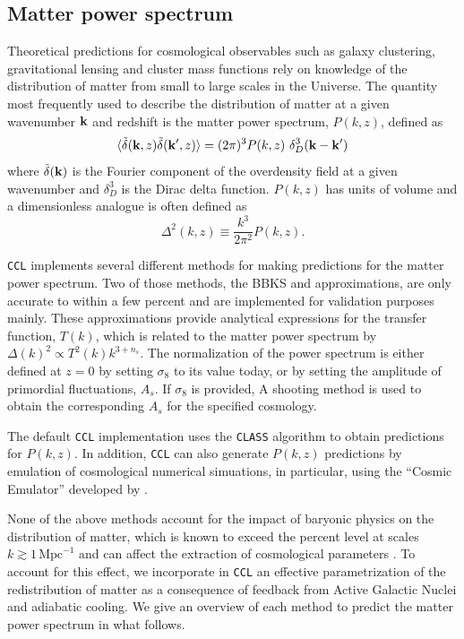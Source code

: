 \documentclass[\docopts]{\docclass}
\newcommand{\ccl}{{\tt CCL}\xspace}
\begin{document}
\subsection{Matter power spectrum}
\label{sec:matterps}

Theoretical predictions for cosmological observables such as galaxy clustering, gravitational lensing and cluster mass functions rely on knowledge of the distribution of matter from small to large scales in the Universe. The quantity most frequently used to describe the distribution of matter at a given wavenumber ${\bf k}$ and redshift is the matter power spectrum, $P(k,z)$, defined as
\begin{equation}
  \langle \tilde\delta({\bf k},z)\tilde\delta({\bf k}^\prime,z)\rangle = (2\pi)^3P(k,z)\
\delta_D^3({\bf k}-{\bf k}')
\end{equation}
where $\tilde\delta({\bf k})$ is the Fourier component of the overdensity field at a given wavenumber and $\delta_D^3$ is the Dirac delta function. $P(k,z)$ has units of volume and a dimensionless analogue is often defined as
\begin{equation}
  \Delta^2(k,z) \equiv \frac{k^3}{2\pi^2}P(k,z).
\end{equation}

\ccl implements several different methods for making predictions for the matter power spectrum. Two of those methods, the BBKS \citep{BBKS} and \citet{1998ApJ...496..605E} approximations, are only accurate to within a few percent and are implemented for validation purposes mainly. These approximations provide analytical expressions for the transfer function, $T(k)$, which is related to the matter power spectrum by $\Delta(k)^2 \propto T^2(k) k^{3+n_s}$. The normalization of the power spectrum is either defined at $z=0$ by setting $\sigma_8$ to its value today, or by setting the amplitude of primordial fluctuations, $A_s$. If $\sigma_8$ is provided, A shooting method is used to obtain the corresponding $A_s$ for the specified cosmology.

The default \ccl implementation uses the {\tt CLASS} algorithm \citet{class} to obtain predictions for $P(k,z)$. In addition, \ccl can also generate $P(k,z)$ predictions by emulation of cosmological numerical simuations, in particular, using the ``Cosmic Emulator'' developed by \citet{Lawrence17}. 

None of the above methods account for the impact of baryonic physics on the distribution of matter, which is known to exceed the percent level at scales $k \gtrsim 1\,\text{Mpc}^{-1}$ \citep{vanDaalen11,Illustris,Hellwing16,Springel17} and can affect the extraction of cosmological parameters \citep{Semboloni11,Semboloni13,Mohammed14,Eifler15,Mohammed17}. To account for this effect, we incorporate in \ccl an effective parametrization \citep{Schneider15} of the redistribution of matter as a consequence of feedback from Active Galactic Nuclei and adiabatic cooling. We give an overview of each method to predict the matter power spectrum in what follows.
\end{document}

